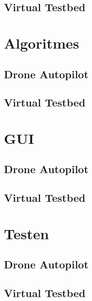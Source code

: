 \documentclass[eind]{penoverslag}
\begin{document}
\subsection{Virtual Testbed}
\label{sec:SoftwareVirtualTestbed}



\section{Algoritmes}
\label{sec:Algoritmes}


\subsection{Drone Autopilot}
\label{sec:AlgoritmesAutopilot}



\subsection{Virtual Testbed}
\label{sec:AlgoritmesVirtualTestbed}



\newpage
\section{GUI}
\label{sec:GUI}


\subsection{Drone Autopilot}


\subsection{Virtual Testbed}
\label{sec:GUIVirtualTestbed}



\section{Testen}
\label{sec:Testen}


\subsection{Drone Autopilot}


\subsection{Virtual Testbed}

\end{document}
